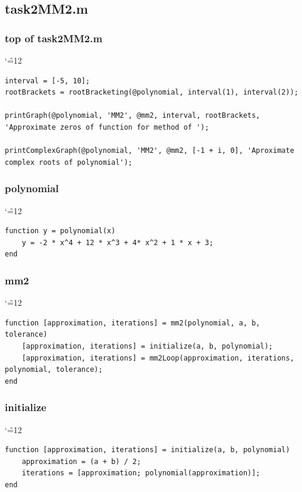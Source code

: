\documentclass[12pt]{report}
\newenvironment{simplechar}{%
   \catcode`\^=12
}{}
\begin{document}
\newpage
\subsection{task2MM2.m}


\subsubsection{top of task2MM2.m}
\begin{simplechar}
\begin{lstlisting}
interval = [-5, 10];
rootBrackets = rootBracketing(@polynomial, interval(1), interval(2));

printGraph(@polynomial, 'MM2', @mm2, interval, rootBrackets, 'Approximate zeros of function for method of ');

printComplexGraph(@polynomial, 'MM2', @mm2, [-1 + i, 0], 'Aproximate complex roots of polynomial');
\end{lstlisting}
\end{simplechar}

\subsubsection{polynomial}
\begin{simplechar}
\begin{lstlisting}
function y = polynomial(x)
    y = -2 * x^4 + 12 * x^3 + 4* x^2 + 1 * x + 3;
end

\end{lstlisting}
\end{simplechar}

\subsubsection{mm2}
\begin{simplechar}
\begin{lstlisting}
function [approximation, iterations] = mm2(polynomial, a, b, tolerance)
    [approximation, iterations] = initialize(a, b, polynomial);
    [approximation, iterations] = mm2Loop(approximation, iterations, polynomial, tolerance);
end
\end{lstlisting}
\end{simplechar}

\subsubsection{initialize}
\begin{simplechar}
\begin{lstlisting}
function [approximation, iterations] = initialize(a, b, polynomial)
    approximation = (a + b) / 2;
    iterations = [approximation; polynomial(approximation)];
end

\end{lstlisting}
\end{simplechar}
\end{document}
